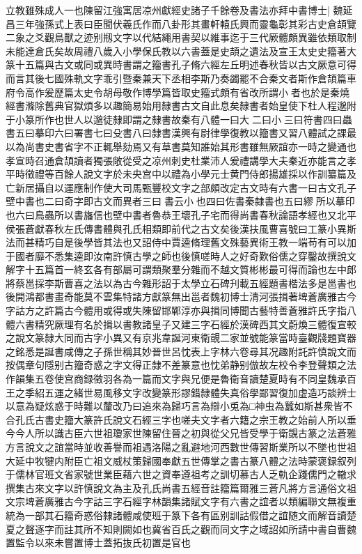 立教雖殊成人一也陳留江強寓居凉州獻經史諸子千餘卷及書法亦拜中書博士|{
	魏延昌三年強孫式上表曰臣聞伏羲氏作而八卦形其畫軒轅氏興而靈龜彰其彩古史倉頡覽二象之爻觀鳥獸之迹别剏文字以代結繩用書契以維事迄于三代厥體頗異雖依類取制未能達倉氏矣故周禮八歲入小學保氏教以六書蓋是史頡之遺法及宣王太史史籀著大篆十五篇與古文或同或異時書謂之籀書孔子脩六經左丘明述春秋皆以古文厥意可得而言其後七國殊軌文字乖引暨秦兼天下丞相李斯乃奏蠲罷不合秦文者斯作倉頡篇車府令高作爰歷篇太史令胡母敬作博學篇皆取史籀式頗有省改所謂小者也於是秦燒經書滌除舊典官獄煩多以趣簡易始用隸書古文自此息矣隸書者始皇使下杜人程邈附于小篆所作也世人以邈徒隸即謂之隸書故秦有八體一曰大二曰小三曰符書四曰蟲書五曰摹印六曰署書七曰殳書八曰隸書漢興有尉律學復教以籀書又習八體試之課最以為尚書史書省字不正輒舉劾焉又有草書莫知誰始其形書雖無厥誼亦一時之變通也孝宣時召通倉頡讀者獨張敞從受之凉州刺史杜業沛人爰禮講學大夫秦近亦能言之孝平時徵禮等百餘人說文字於未央宫中以禮為小學元士黄門侍郎揚雄採以作訓纂篇及亡新居攝自以運應制作使大司馬甄豐校文字之部頗改定古文時有六書一曰古文孔子壁中書也二曰奇字即古文而異者三曰書云小也四曰佐書秦隸書也五曰繆所以摹印也六曰鳥蟲所以書旛信也壁中書者魯恭王壞孔子宅而得尚書春秋論語孝經也又北平侯張蒼獻春秋左氏傳書體與孔氏相類即前代之古文矣後漢扶風曹喜號曰工篆小異斯法而甚精巧自是後學皆其法也又詔侍中賈逵脩理舊文殊藝異術王教一端苟有可以加于國者靡不悉集逵即汝南許慎古學之師也後慎嗟時人之好奇歎俗儒之穿鑿故撰說文解字十五篇首一終玄各有部屬可謂類聚羣分雜而不越文質彬彬最可得而論也左中郎將蔡邕採李斯曹喜之法以為古今雜形詔于太學立石碑刋載五經題書楷法多是邕書也後開鴻都書畫奇能莫不雲集特諸方獻篆無出邕者魏初博士清河張揖著埤蒼廣雅古今字詁方之許篇古今體用或得或失陳留邯鄲淳亦與揖同博聞古藝特善蒼雅許氏字指八體六書精究厥理有名於揖以書教諸皇子又建三字石經於漢碑西其文蔚煥三體復宣較之說文篆隸大同而古字小異又有京兆韋誕河東衛覬二家並號能篆當時臺觀牋題寶器之銘悉是誕書咸傳之子孫世稱其妙晉世呂忱表上字林六卷尋其况趣附託許慎說文而按偶章句隱别古籀奇惑之字文得正隸不差篆意也忱弟静别倣故左校令李登聲類之法作韻集五卷使宫商録徵羽各為一篇而文字與兄便是魯衛音讀楚夏時有不同皇魏承百王之季紹五運之緒世易風移文字改變篆形謬錯隸體失真俗學鄙習復加虚造巧談辨士以意為疑炫惑于時難以釐改乃曰追來為歸巧言為辯小兎為□神虫為蠶如斯甚衆皆不合孔氏古書史籀大篆許氏說文石經三字也嗟夫文字者六籍之宗王教之始前人所以垂今今人所以識古臣六世祖瓊家世陳留住晉之初與從父兄皆受學于衛覬古篆之法蒼雅方言說文之誼當時並收善譽而祖遇洛陽之亂避地河西數世傳習斯業所以不墜也世祖大延中牧犍内附臣亡祖文威杖策歸國奉獻五世傳掌之書古篆八體之法時蒙褒録叙列于儒林官班文省家號世業臣藉六世之資奉遵祖考之訓切慕古人乏軌企踐儒門之轍求撰集古來文字以許慎說文為主及孔氏尚書五經音註籀篇爾雅三蒼凡將方言通俗文祖文宗埤蒼廣雅古今字詁三字石經字林韻集諸賦文字有六書之誼者以類編聯文無複重統為一部其石籀奇惑俗隸諸體咸使班于篆下各有區别訓詁假借之誼随文而解音讀楚夏之聲逐字而註其所不知則闕如也冀省百氏之觀而同文字之域詔如所請中書自曹魏置監令以來未嘗置博士蓋拓抜氏初置是官也}
